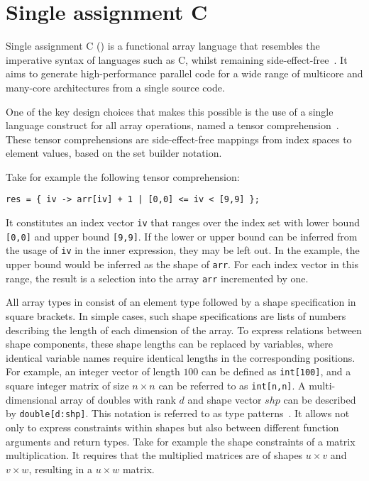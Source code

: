 
\section{Single assignment C}\label{sac}

Single assignment C (\sac{}) is a functional array language that resembles the imperative syntax of
languages such as C, whilst remaining side-effect-free~\cite{sac1,sac2}. It aims to generate
high-performance parallel code for a wide range of multicore and many-core architectures from a
single source code.

One of the key design choices that makes this possible is the use of a single language construct for
all array operations, named a tensor comprehension~\cite{sac-tensor}. These tensor comprehensions
are side-effect-free mappings from index spaces to element values, based on the set builder
notation.

Take for example the following tensor comprehension:
\begin{verbatim}
res = { iv -> arr[iv] + 1 | [0,0] <= iv < [9,9] };
\end{verbatim}

It constitutes an index vector \verb|iv| that ranges over the index set with lower bound
\verb|[0,0]| and upper bound \verb|[9,9]|. If the lower or upper bound can be inferred from the
usage of \verb|iv| in the inner expression, they may be left out. In the example, the upper bound
would be inferred as the shape of \verb|arr|. For each index vector in this range, the result is a
selection into the array \verb|arr| incremented by one.

All array types in \sac{} consist of an element type followed by a shape specification in square
brackets. In simple cases, such shape specifications are lists of numbers describing the length of
each dimension of the array. To express relations between shape components, these shape lengths can
be replaced by variables, where identical variable names require identical lengths in the
corresponding positions. For example, an integer vector of length $100$ can be defined as
\verb|int[100]|, and a square integer matrix of size $n \times n$ can be referred to as
\verb|int[n,n]|. A multi-dimensional array of doubles with rank $d$ and shape vector $shp$ can be
described by \verb|double[d:shp]|. This notation is referred to as type
patterns~\cite{sac-typepattern}. It allows not only to express constraints within shapes but also
between different function arguments and return types. Take for example the shape constraints of a
matrix multiplication. It requires that the multiplied matrices are of shapes $u \times v$ and $v
\times w$, resulting in a $u \times w$ matrix.

